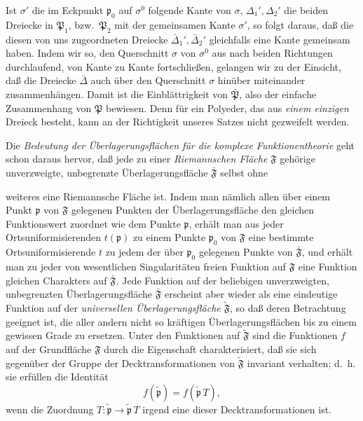 \documentclass{article}
\begin{document}
Ist $\sigma'$ die im Eckpunkt $\mathfrak{p}_0$ auf $\sigma^0$ folgende Kante von $\sigma$, $\Delta_1', \Delta_2'$ die beiden Dreiecke in $\mathfrak{P}_1$, bzw.\ $\mathfrak{P}_2$ mit der gemeinsamen Kante $\sigma'$, so folgt daraus, daß die diesen von uns zugeordneten Dreiecke $\bar{\Delta}_1', \bar{\Delta}_2'$ gleichfalls eine Kante gemeinsam haben. Indem wir so, den Querschnitt $\sigma$ von $\sigma^0$ aus nach beiden Richtungen durchlaufend, von Kante zu Kante fortschließen, gelangen wir zu der Einsicht, daß die Dreiecke $\bar{\Delta}$ auch über den Querschnitt $\sigma$ hinüber miteinander zusammenhängen. Damit ist die Einblättrigkeit von $\bar{\mathfrak{P}}$, also der einfache Zusammenhang von $\mathfrak{P}$ bewiesen. Denn für ein Polyeder, das aus \emph{einem einzigen} Dreieck besteht, kann an der Richtigkeit unseres Satzes nicht gezweifelt werden.

Die \emph{Bedeutung der Überlagerungsflächen für die komplexe Funktionentheorie} geht schon daraus hervor, daß jede zu einer \emph{Riemannschen Fläche} $\mathfrak{F}$ gehörige unverzweigte, unbegrenzte Überlagerungsfläche $\bar{\mathfrak{F}}$ selbst ohne

weiteres eine Riemannsche Fläche ist. Indem man nämlich allen über einem Punkt $\mathfrak{p}$ von $\mathfrak{F}$ gelegenen Punkten der Überlagerungsfläche den gleichen Funktionswert zuordnet wie dem Punkte $\mathfrak{p}$, erhält man aus jeder Ortsuniformisierenden $t(\mathfrak{p})$ zu einem Punkte $\mathfrak{p}_0$ von $\mathfrak{F}$ eine bestimmte Ortsuniformisierende $t$ zu jedem der über $\mathfrak{p}_0$ gelegenen Punkte von $\bar{\mathfrak{F}}$, und erhält man zu jeder von wesentlichen Singularitäten freien Funktion auf $\mathfrak{F}$ eine Funktion gleichen Charakters auf $\bar{\mathfrak{F}}$. Jede Funktion auf der beliebigen unverzweigten, unbegrenzten Überlagerungsfläche $\bar{\mathfrak{F}}$ erscheint aber wieder als eine eindeutige Funktion auf der \emph{universellen Überlagerungsfläche} $\tilde{\mathfrak{F}}$, so daß deren Betrachtung geeignet ist, die aller andern nicht so kräftigen Überlagerungsflächen bis zu einem gewissen Grade zu ersetzen. Unter den Funktionen auf $\tilde{\mathfrak{F}}$ sind die Funktionen $f$ auf der Grundfläche $\mathfrak{F}$ durch die Eigenschaft charakterisiert, daß sie sich gegenüber der Gruppe der Decktransformationen von $\tilde{\mathfrak{F}}$ invariant verhalten; d.~h. sie erfüllen die Identität
\[ f(\tilde{\mathfrak{p}}) = f(\tilde{\mathfrak{p}}\,T), \]
wenn die Zuordnung $T\colon \tilde{\mathfrak{p}} \to \tilde{\mathfrak{p}}\,T$ irgend eine dieser Decktransformationen ist.
\end{document}
